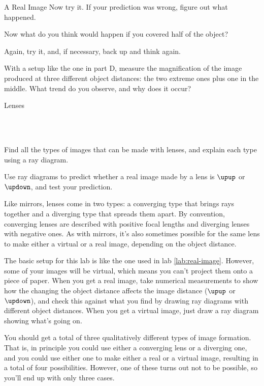 \begin{lab}{A Real Image}
Now try it. If your prediction was wrong, figure out what happened.

Now what do you think would happen if you covered half of the object?

\labprediction

Again, try it, and, if necessary, back up and think again.

With a setup like the one in part D, measure the magnification of the image produced at three
different object distances: the two extreme ones plus one in the middle. What trend do you
observe, and why does it occur?

\end{lab}


\begin{lab}[0]{Lenses}

\apparatus
{}\\
\\

\begin{goals}

\item[] Find all the types of images that can be made with lenses, and explain each
type using a ray diagram.

\item[] Use ray diagrams to predict whether a real image made by a lens
 is $\upup$ or $\updown$, and
test your prediction.

\end{goals}

Like mirrors, lenses come in two types: a converging type that brings rays together
and a diverging type that spreads them apart. By convention, converging lenses are
described with positive focal lengths and diverging lenses with negative ones.
As with mirrors, it's also sometimes possible
for the same lens to make either a virtual or a real image, depending on the object distance.

The basic setup for this lab is like the one used in lab \thechapter\ref{lab:real-image}. However, some of
your images will be virtual, which means you can't project them onto a piece of paper.
When you get a real image, take numerical measurements to show how the changing the object distance
affects the image distance ($\upup$ or $\updown$), and check this against what you find by
drawing ray diagrams with different object distances.
When you get a virtual image, just draw a ray diagram showing what's going on.

You should get a total of three qualitatively different types of image formation. That is,
in principle you could use either a converging lens or a diverging one, and you could
use either one to make either a real or a virtual image, resulting in a total of four
possibilities. However, one of these turns out not to be possible, so you'll end up with
only three cases.



\end{lab}


